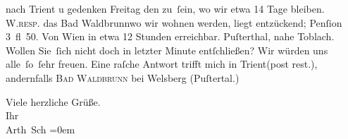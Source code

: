                nach Trient u gedenken Freitag den \label{K_L04078-3v}\label{K_L04078-3} zu ſein, wo wir etwa 14 Tage bleiben. W.\textsc{resp.} das Bad Waldbrunnwo wir wohnen werden, liegt entzückend;
               Penſion 3 fl 50. Von Wien in etwa 12 Stunden
               erreichbar. Puſterthal, nahe Toblach. Wollen Sie ſich nicht doch in letzter Minute entſchließen? Wir
               würden uns alle ſo ſehr freuen. Eine raſche Antwort trifft mich in Trient\introOben{}(post
                  rest.)\introOben{}, andernfalls \textsc{Bad Waldbrunn} bei Welsberg (Puſtertal.)\pend
           
\pstart
           Viele herzliche Grüße.{\\[\baselineskip]} Ihr{\\[\baselineskip]}\spacefill\mbox{Arth Sch}\pend
           \leftskip=0em{}\endnumbering{}
\begin{anhang}
\end{anhang}\newcommand{\dateiname}{L04078}\newcommand{\titel}{Arthur Schnitzler an Gustav Schwarzkopf, 10. 8. 1901}\newcommand{\editorInnen}{Herausgegeben von Jahnke, SelmaMüller, Martin Anton}
